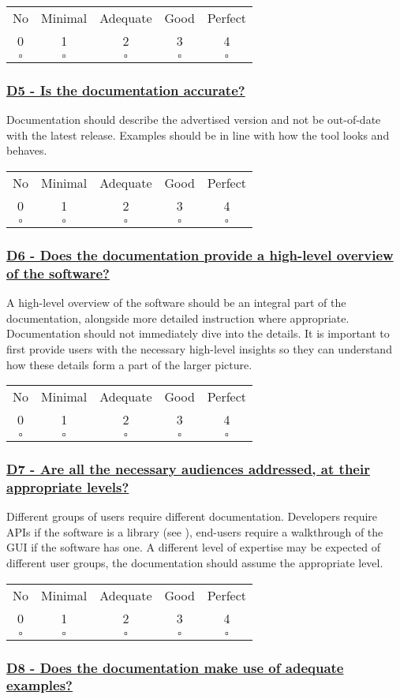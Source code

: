 \documentclass[a4paper,11pt]{article}
\newcommand{\criterion}[2]{\subsubsection*{\underline{#1 - #2}}\label{id:#1}}
\newcommand\CheckTable{%
  \begin{tabular}{ccccc}
    No & Minimal & Adequate & Good & Perfect \\
    0 & 1 & 2 & 3 & 4 \\
    \hline
    $\square$ & $\square$ & $\square$ & $\square$ & $\square$ \\
  \end{tabular}%
}
\newcommand{\refcrit}[1]{%
 \framebox[1.1\width]{\hyperref[id:#1]{#1}}
}
\begin{document}
%
%
%

\CheckTable

\newcommand{\dFiveID}{D5}
\newcommand{\dFiveText}{Is the documentation accurate?}
\criterion{\dFiveID}{\dFiveText}

Documentation should describe the advertised version and not be out-of-date
with the latest release. Examples should be in line with how the tool looks and
behaves.

\CheckTable

\newcommand{\dSixID}{D6}
\newcommand{\dSixText}{Does the documentation provide a high-level overview of the software?}
\criterion{\dSixID}{\dSixText}

A high-level overview of the software should be an integral part of the
documentation, alongside more detailed instruction where appropriate.
Documentation should not immediately dive into the details. It is important to
first provide users with the necessary high-level insights so they can understand how
these details form a part of the larger picture.


\CheckTable

\newcommand{\dSevenID}{D7}
\newcommand{\dSevenText}{Are all the necessary audiences addressed, at their appropriate levels?}
\criterion{\dSevenID}{\dSevenText}

Different groups of users require different documentation. Developers require
APIs if the software is a library (see \refcrit{L4}), end-users require a walkthrough of the GUI
if the software has one. A different level of expertise may be expected of
different user groups, the documentation should assume the appropriate level.

\CheckTable

\newcommand{\dEightID}{D8}
\newcommand{\dEightText}{Does the documentation make use of adequate examples?}
\criterion{\dEightID}{\dEightText}
\end{document}
